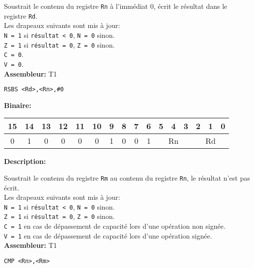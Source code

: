 Soustrait le contenu du registre \texttt{Rn} à l'immédiat 0, écrit le résultat dans le registre \texttt{Rd}.\\
Les drapeaux suivants sont mis à jour:\\
\texttt{N = 1} si \texttt{résultat < 0}, \texttt{N = 0} sinon.\\
\texttt{Z = 1} si \texttt{résultat = 0}, \texttt{Z = 0} sinon.\\
\texttt{C = 0}.\\
\texttt{V = 0}.\\

\textbf{Assembleur:} T1

\begin{lstlisting}
RSBS <Rd>,<Rn>,#0
\end{lstlisting}

\textbf{Binaire:}\\

\begin{tabular}{| c c c c c c c c c c c c c c c c |}
\hline
15 & 14 & 13 & 12 & 11 & 10 & \multicolumn{1}{|c}{9} & 8 & 7 & 6 & \multicolumn{1}{|c}{5} & 4 & 3 & \multicolumn{1}{|c}{2} & 1 & 0 \\
\hline
0 & 1 & 0 & 0 & 0 & 0 & \multicolumn{1}{|c}{1} & 0 & 0 & 1 & \multicolumn{3}{|c}{Rn} & \multicolumn{3}{|c|}{Rd} \\
\hline
\end{tabular}




\textbf{Description: }

Soustrait le contenu du registre \texttt{Rm} au contenu du registre \texttt{Rn}, le résultat n'est pas écrit.\\
Les drapeaux suivants sont mis à jour:\\
\texttt{N = 1} si \texttt{résultat < 0}, \texttt{N = 0} sinon.\\
\texttt{Z = 1} si \texttt{résultat = 0}, \texttt{Z = 0} sinon.\\
\texttt{C = 1} en cas de dépassement de capacité lors d'une opération non signée.\\
\texttt{V = 1} en cas de dépassement de capacité lors d'une opération signée.\\

\textbf{Assembleur:} T1

\begin{lstlisting}
CMP <Rn>,<Rm>
\end{lstlisting}

